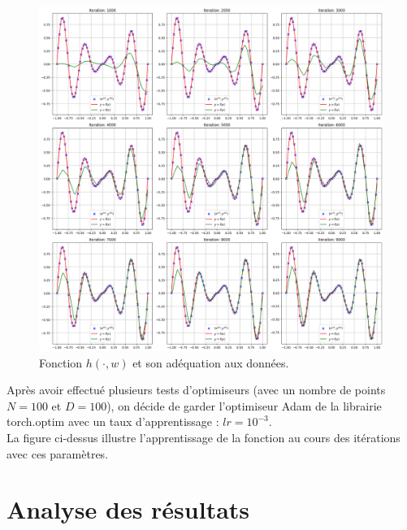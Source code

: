 \documentclass[12pt,a4paper]{article}
\begin{document}
\begin{enumerate}
    \begin{figure}[ht]
        \centering
        \includegraphics[width=1\textwidth]{src/h_w.png}
        \caption{Fonction $h(\cdot, w)$ et son adéquation aux données.}
        \label{fig:h_w}
    \end{figure}

    Après avoir effectué plusieurs tests d'optimiseurs (avec un nombre de points $N = 100$ et $D = 100$), on décide de garder l'optimiseur Adam de la librairie torch.optim avec un taux d'apprentissage : $lr = 10^{-3}$.\\
    La figure ci-dessus illustre l'apprentissage de la fonction au cours des itérations avec ces paramètres.

\end{enumerate}


\newpage

\section{Analyse des résultats}
\end{document}
